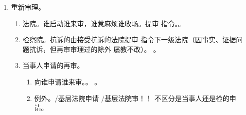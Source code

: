 \begin{enumerate}
\begin{enumerate}
\begin{enumerate}
                  \item 主观知道裁判文书生效之日起的 6 个月内提出。
                  \item {}（方便当事人）。。
                  \item {}  月审查。
                  \item 只有 2 个结果。。。
                  \item {}。法院 \yjt {}。
                        \begin{enumerate}
                          \item 驳回再审申请。
                          \item 逾期未对再审申请作出裁定。
                          \item 再审判决、裁定仍有明显错误。
                        \end{enumerate}
                  \item 不予受理的情形。
                \end{enumerate}
          \item 案外人。\yi {}。\er 本应作为原审共同原、被告 \yjt 申请再审。
        \end{enumerate}
  \item 重新审理。
        \begin{enumerate}
          \item 法院。谁启动谁来审，谁惹麻烦谁收场。提审 \dy 指令。。
          \item 检察院。抗诉的由接受抗诉的法院提审 \hz 指令下一级法院（因事实、证据问题抗诉，但再审审理过的除外 \yjt 屡教不改）。
                。
          \item 当事人申请的再审。
                \begin{enumerate}
                  \item 向谁申请谁来审。。
                        。
                  \item 例外。/基层法院申请 \yjt {}/基层法院审！！
                        不区分是当事人还是检的申请。

\end{enumerate}
\end{enumerate}
\end{enumerate}

